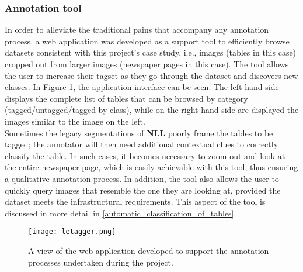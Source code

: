\subsubsection{Annotation tool}
In order to alleviate the traditional pains that accompany any annotation process, a web application was developed as a support tool to efficiently browse datasets consistent with this project's case study, i.e., images (tables in this case) cropped out from larger images (newspaper pages in this case). The tool allows the user to increase their tagset as they go through the dataset and discovers new classes. In Figure \ref{letagger}, the application interface can be seen. The left-hand side displays the complete list of tables that can be browsed by category (tagged/untagged/tagged by class), while on the right-hand side are displayed the images similar to the image on the left.\\
Sometimes the legacy segmentations of \textbf{NLL} poorly frame the tables to be tagged; the annotator will then need additional contextual clues to correctly classify the table. In such cases, it becomes necessary to zoom out and look at the entire newspaper page, which is easily achievable with this tool, thus ensuring a qualitative annotation process. In addition, the tool also allows the user to quickly query images that resemble the one they are looking at, provided the dataset meets the infrastructural requirements. This aspect of the tool is discussed in more detail in \ref{automatic_classification_of_tables}.\\

\begin{figure}[h]
\centering
\texttt{[image: letagger.png]}
\caption{A view of the web application developed to support the annotation processes undertaken during the project.}
\label{letagger}
\end{figure}

